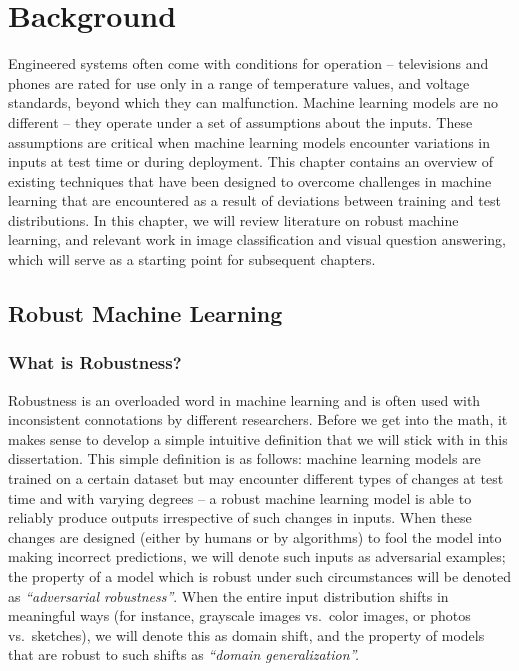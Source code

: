\chapter{Background}
\label{chap:background}
Engineered systems often come with conditions for operation -- televisions and phones are rated for use only in a range of temperature values, and voltage standards, beyond which they can malfunction.
Machine learning models are no different -- they operate under a set of assumptions about the inputs.
These assumptions are critical when machine learning models encounter variations in inputs at test time or during deployment.
This chapter contains an overview of existing techniques that have been designed to overcome challenges in machine learning that are encountered as a result of deviations between training and test distributions.
In this chapter, we will review literature on robust machine learning, and relevant work in image classification and visual question answering, which will serve as a starting point for subsequent chapters.

\section{Robust Machine Learning}

\subsection{What is Robustness?}
Robustness is an overloaded word in machine learning and is often used with inconsistent connotations by different researchers.
Before we get into the math, it makes sense to develop a simple intuitive definition that we will stick with in this dissertation.
This simple definition is as follows:  machine learning models are trained on a certain dataset but may encounter different types of changes at test time and with varying degrees -- a robust machine learning model is able to reliably produce outputs irrespective of such changes in inputs.
When these changes are designed (either by humans or by algorithms) to fool the model into making incorrect predictions, we will denote such inputs as adversarial examples; the property of a model which is robust under such circumstances will be denoted as \textit{``adversarial robustness''}.
When the entire input distribution shifts in meaningful ways (for instance, grayscale images vs.~color images, or photos vs.~sketches), we will denote this as domain shift, and the property of models that are robust to such shifts as \textit{``domain generalization''.}



